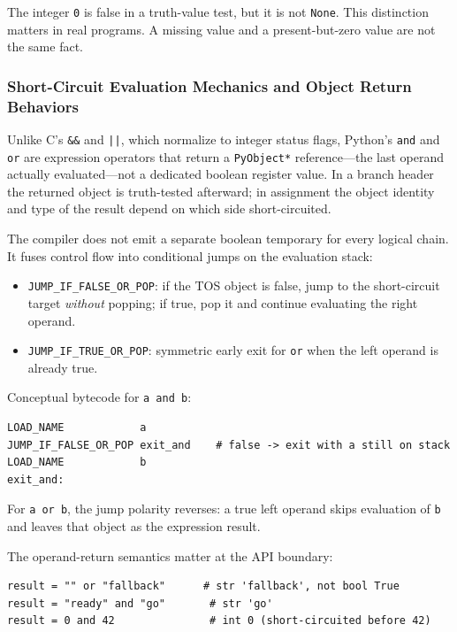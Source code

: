 The integer \texttt{0} is false in a truth-value test, but it is not \texttt{None}. This distinction matters in real programs. A missing value and a present-but-zero value are not the same fact.

\subsubsection{Short-Circuit Evaluation Mechanics and Object Return Behaviors}

Unlike C's \texttt{\&\&} and \texttt{||}, which normalize to integer status flags, Python's \texttt{and} and \texttt{or} are expression operators that return a \texttt{PyObject*} reference---the last operand actually evaluated---not a dedicated boolean register value. In a branch header the returned object is truth-tested afterward; in assignment the object identity and type of the result depend on which side short-circuited.

The compiler does not emit a separate boolean temporary for every logical chain. It fuses control flow into conditional jumps on the evaluation stack:

\begin{itemize}
    \item \texttt{JUMP\_IF\_FALSE\_OR\_POP}: if the TOS object is false, jump to the short-circuit target \emph{without} popping; if true, pop it and continue evaluating the right operand.
    \item \texttt{JUMP\_IF\_TRUE\_OR\_POP}: symmetric early exit for \texttt{or} when the left operand is already true.
\end{itemize}

Conceptual bytecode for \texttt{a and b}:

\begin{verbatim}
LOAD_NAME            a
JUMP_IF_FALSE_OR_POP exit_and    # false -> exit with a still on stack
LOAD_NAME            b
exit_and:
\end{verbatim}

For \texttt{a or b}, the jump polarity reverses: a true left operand skips evaluation of \texttt{b} and leaves that object as the expression result.

The operand-return semantics matter at the API boundary:

\begin{verbatim}
result = "" or "fallback"      # str 'fallback', not bool True
result = "ready" and "go"       # str 'go'
result = 0 and 42               # int 0 (short-circuited before 42)
\end{verbatim}

